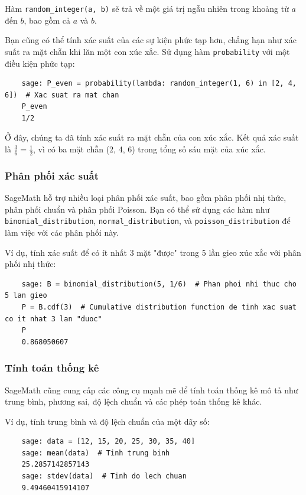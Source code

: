 Hàm \texttt{random\_integer(a, b)} sẽ trả về một giá trị ngẫu nhiên trong khoảng từ \(a\) đến \(b\), bao gồm cả \(a\) và \(b\).

Bạn cũng có thể tính xác suất của các sự kiện phức tạp hơn, chẳng hạn như xác suất ra mặt chẵn khi lăn một con xúc xắc. Sử dụng hàm \texttt{probability} với một điều kiện phức tạp:

\begin{lstlisting}
	sage: P_even = probability(lambda: random_integer(1, 6) in [2, 4, 6])  # Xac suat ra mat chan
	P_even
	1/2
\end{lstlisting}

Ở đây, chúng ta đã tính xác suất ra mặt chẵn của con xúc xắc. Kết quả xác suất là \( \frac{3}{6} = \frac{1}{2} \), vì có ba mặt chẵn (2, 4, 6) trong tổng số sáu mặt của xúc xắc.

\subsubsection{Phân phối xác suất}

SageMath hỗ trợ nhiều loại phân phối xác suất, bao gồm phân phối nhị thức, phân phối chuẩn và phân phối Poisson. Bạn có thể sử dụng các hàm như\\ \texttt{binomial\_distribution}, \texttt{normal\_distribution}, và \texttt{poisson\_distribution} để làm việc với các phân phối này.

Ví dụ, tính xác suất để có ít nhất 3 mặt "được" trong 5 lần gieo xúc xắc với phân phối nhị thức:

\begin{lstlisting}
	sage: B = binomial_distribution(5, 1/6)  # Phan phoi nhi thuc cho 5 lan gieo
	P = B.cdf(3)  # Cumulative distribution function de tinh xac suat co it nhat 3 lan "duoc"
	P
	0.868050607
\end{lstlisting}

\subsubsection{Tính toán thống kê}

SageMath cũng cung cấp các công cụ mạnh mẽ để tính toán thống kê mô tả như trung bình, phương sai, độ lệch chuẩn và các phép toán thống kê khác.

Ví dụ, tính trung bình và độ lệch chuẩn của một dãy số:

\begin{lstlisting}
	sage: data = [12, 15, 20, 25, 30, 35, 40]
	sage: mean(data)  # Tinh trung binh
	25.2857142857143
	sage: stdev(data)  # Tinh do lech chuan
	9.49460415914107
\end{lstlisting}

